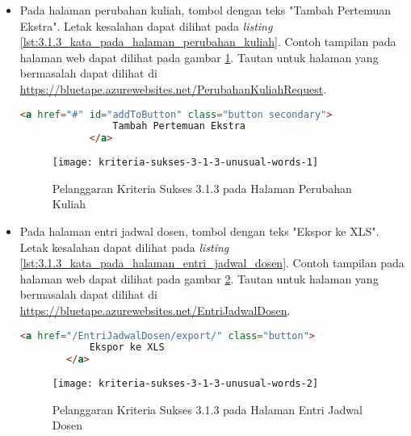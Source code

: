 \begin{itemize}
    \item Pada halaman perubahan kuliah, tombol dengan teks "Tambah Pertemuan Ekstra". Letak kesalahan dapat dilihat pada \textit{listing} \ref{lst:3.1.3_kata_pada_halaman_perubahan_kuliah}. Contoh tampilan pada halaman web dapat dilihat pada gambar \ref{fig:3.1.3_unusual_words_1}. Tautan untuk halaman yang bermasalah dapat dilihat di \url{https://bluetape.azurewebsites.net/PerubahanKuliahRequest}.
    \begin{lstlisting}[frame=single, label={lst:3.1.3_kata_pada_halaman_perubahan_kuliah}, language=HTML, caption=Pelanggaran Kriteria Sukses 3.1.3 pada Halaman Perubahan Kuliah]
            <a href="#" id="addToButton" class="button secondary">
                Tambah Pertemuan Ekstra
            </a>
    \end{lstlisting}
    
    \begin{figure}[H]
        \centering  
        \texttt{[image: kriteria-sukses-3-1-3-unusual-words-1]}  
        \caption[Pelanggaran Kriteria Sukses 3.1.3 pada Halaman Perubahan Kuliah]{Pelanggaran Kriteria Sukses 3.1.3 pada Halaman Perubahan Kuliah}
        \label{fig:3.1.3_unusual_words_1}  
    \end{figure}
    
    \item Pada halaman entri jadwal dosen, tombol dengan teks "Ekspor ke XLS". Letak kesalahan dapat dilihat pada \textit{listing} \ref{lst:3.1.3_kata_pada_halaman_entri_jadwal_dosen}. Contoh tampilan pada halaman web dapat dilihat pada gambar \ref{fig:3.1.3_unusual_words_2}. Tautan untuk halaman yang bermasalah dapat dilihat di \url{https://bluetape.azurewebsites.net/EntriJadwalDosen}.
    \begin{lstlisting}[frame=single, label={lst:3.1.3_kata_pada_halaman_entri_jadwal_dosen}, language=HTML, caption=Pelanggaran Kriteria Sukses 3.1.3 pada Halaman Entri Jadwal Dosen]
        <a href="/EntriJadwalDosen/export/" class="button">
            Ekspor ke XLS
        </a>
    \end{lstlisting}
    
    \begin{figure}[H]
        \centering  
        \texttt{[image: kriteria-sukses-3-1-3-unusual-words-2]}  
        \caption[Pelanggaran Kriteria Sukses 3.1.3 pada Halaman Entri Jadwal Dosen]{Pelanggaran Kriteria Sukses 3.1.3 pada Halaman Entri Jadwal Dosen}
        \label{fig:3.1.3_unusual_words_2}  
    \end{figure}


\end{itemize}
